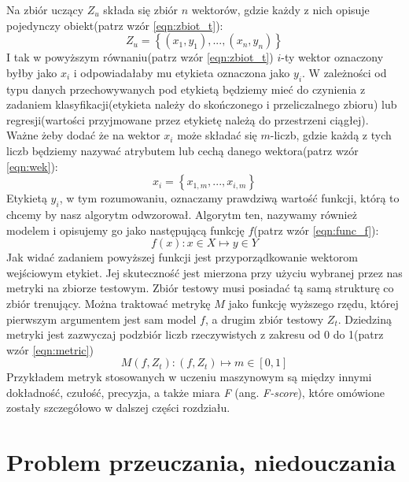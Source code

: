 Na zbiór uczący $Z_{u}$ składa się zbiór $n$ wektorów, gdzie każdy z nich opisuje pojedynczy obiekt(patrz wzór \ref{eqn:zbiot_t}):
\begin{equation}
Z_{u}=\left \{(x_{1},y_{1}),...,(x_{n},y_{n})\right \}
\label{eqn:zbiot_t}
\end{equation}
I tak w powyższym równaniu(patrz wzór \ref{eqn:zbiot_t}) $i$-ty wektor oznaczony byłby jako $x_{i}$ i odpowiadałaby mu etykieta oznaczona jako $y_{i}$. W zależności od typu danych przechowywanych pod etykietą będziemy mieć do czynienia z zadaniem klasyfikacji(etykieta należy do skończonego i przeliczalnego zbioru) lub regresji(wartości przyjmowane przez etykietę należą do przestrzeni ciągłej). Ważne żeby dodać że na wektor $x_{i}$ może składać się $m$-liczb, gdzie każdą z tych liczb będziemy nazywać atrybutem lub cechą danego wektora(patrz wzór \ref{eqn:wek}):
\begin{equation}
x_{i} = \left \{ x_{1,m}, ..., x_{i,m} \right \}
\label{eqn:wek}
\end{equation}
Etykietą $y_{i}$, w tym rozumowaniu, oznaczamy prawdziwą wartość funkcji, którą to chcemy by nasz algorytm odwzorował. Algorytm ten, nazywamy również modelem i opisujemy go jako następującą funkcję $f$(patrz wzór \ref{eqn:func_f}):
\begin{equation}
f(x): x \in X \mapsto y \in Y
\label{eqn:func_f}
\end{equation}
Jak widać zadaniem powyższej funkcji jest przyporządkowanie wektorom wejściowym etykiet. Jej skuteczność jest mierzona przy użyciu wybranej przez nas metryki na zbiorze testowym. Zbiór testowy musi posiadać tą samą strukturę co zbiór trenujący. Można traktować metrykę $M$ jako funkcję wyższego rzędu, której pierwszym argumentem jest sam model $f$, a drugim zbiór testowy $Z_{t}$. Dziedziną metryki jest zazwyczaj podzbiór liczb rzeczywistych z zakresu od 0 do 1(patrz wzór \ref{eqn:metric})
\begin{equation}
M(f, Z_{t}): (f, Z_{t}) \mapsto m \in [0, 1]
\label{eqn:metric}
\end{equation}
Przykładem metryk stosowanych w uczeniu maszynowym są między innymi dokładność, czułość, precyzja, a także miara \textit{F} (ang. \textit{F-score}), które
omówione zostały szczegółowo w dalszej części rozdziału.
\\

\section{Problem przeuczania, niedouczania}

